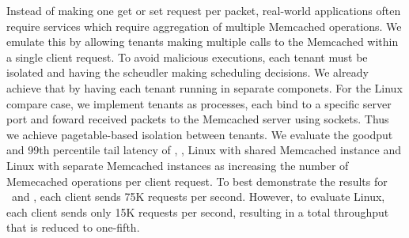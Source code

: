 Instead of making one get or set request per packet, real-world applications often require services which require aggregation of multiple Memcached operations.
We emulate this by allowing tenants making multiple calls to the Memcached within a single client request.
To avoid malicious executions, each tenant must be isolated and having the scheudler making scheduling decisions.
We already achieve that by having each tenant running in separate componets.
For the Linux compare case, we implement tenants as processes, each bind to a specific server port and foward received packets to the Memcached server using sockets.
Thus we achieve pagetable-based isolation between tenants.
We evaluate the goodput and 99th percentile tail latency of \cos , \name , Linux with shared Memcached instance and Linux with separate Memcached instances as increasing the number of Memecached operations per client request.
To best demonstrate the results for \cos\ and \name, each client sends 75K requests per second.
However, to evaluate Linux, each client sends only 15K requests per second, resulting in a total throughput that is reduced to one-fifth.

